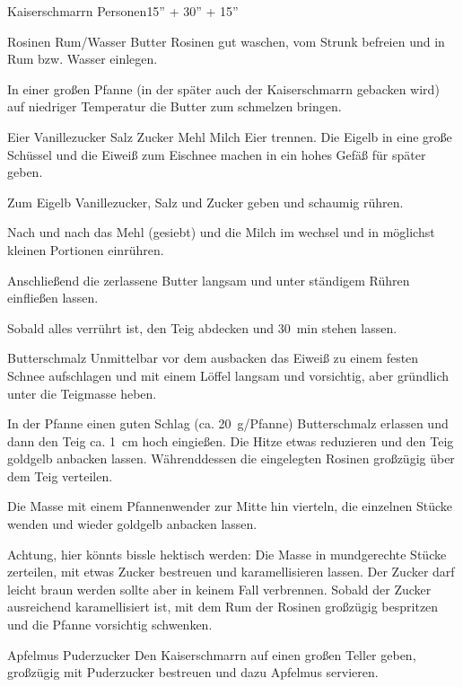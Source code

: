 \begin{MyRecipe}{Kaiserschmarrn}{ Personen}{15'' + 30'' + 15''}
	
	\ingredient[\Calc{60}{\x}]{\si{\gram}} {Rosinen}
	 {Rum/Wasser}
	\ingredient[\Calc{30}{\x}]{\si{\gram}} {Butter}
	Rosinen gut waschen, vom Strunk befreien und in Rum bzw. Wasser einlegen.
	
	In einer großen Pfanne (in der später auch der Kaiserschmarrn gebacken wird) auf niedriger Temperatur die Butter zum schmelzen bringen.\par\bigskip
	
	\ingredient[\Calc{4}{\x}]{} {Eier}
	 {Vanillezucker}
	 {Salz}
	 {Zucker}
	\ingredient[\Calc{0.16}{\x}]{\si{\kilogram}} {Mehl}
	\ingredient[\Calc{0.33}{\x}]{\si{\kilogram}} {Milch}
	Eier trennen. Die Eigelb in eine große Schüssel und die Eiweiß zum Eischnee machen in ein hohes Gefäß für später geben.
	
	Zum Eigelb Vanillezucker, Salz und Zucker geben und schaumig rühren.
	
	Nach und nach das Mehl (gesiebt) und die Milch im wechsel und in möglichst kleinen Portionen einrühren.
	
	Anschließend die zerlassene Butter langsam und unter ständigem Rühren einfließen lassen.
	
	Sobald alles verrührt ist, den Teig abdecken und \SI{30}{\minute} stehen lassen.\par\bigskip
	
	 {Butterschmalz}
	Unmittelbar vor dem ausbacken das Eiweiß zu einem festen Schnee aufschlagen und mit einem Löffel langsam und vorsichtig, aber gründlich unter die Teigmasse heben.
	
	In der Pfanne einen guten Schlag (ca. \SI{20}{\gram}/Pfanne) Butterschmalz erlassen und dann den Teig ca. \SI{1}{\centi\meter} hoch eingießen. Die Hitze etwas reduzieren und den Teig goldgelb anbacken lassen. Währenddessen die eingelegten Rosinen großzügig über dem Teig verteilen.
	
	Die Masse mit einem Pfannenwender zur Mitte hin vierteln, die einzelnen Stücke wenden und wieder goldgelb anbacken lassen.
	
	Achtung, hier könnts bissle hektisch werden:
	Die Masse in mundgerechte Stücke zerteilen, mit etwas Zucker bestreuen und karamellisieren lassen. Der Zucker darf leicht braun werden sollte aber in keinem Fall verbrennen. Sobald der Zucker ausreichend karamellisiert ist, mit dem Rum der Rosinen großzügig bespritzen und die Pfanne vorsichtig schwenken.\par\bigskip
	
	\ingredient[\Calc{0.2}{\x}]{\si{\kilogram}} {Apfelmus}
	 {Puderzucker}
	Den Kaiserschmarrn auf einen großen Teller geben, großzügig mit Puderzucker bestreuen und dazu Apfelmus servieren.
	
	

	
	
	
	
\end{MyRecipe}